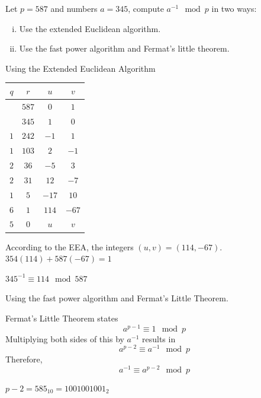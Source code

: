 \documentclass[12pt]{article}
\begin{document}

\problem Let $p=587$ and numbers $a=345$, compute $a^{-1}\mod{p}$ in two
ways:

\begin{enumerate}[(i)]
    \item Use the extended Euclidean algorithm.
    \item Use the fast power algorithm and Fermat’s little theorem. 
\end{enumerate}

\solution Using the Extended Euclidean Algorithm

\noindent
\begin{tabular}{|c|c|c|c|}
    \hline
    $q$ & $r$   & $u$  & $v$  \\
    \hline
        & $587$ & $0$   & $1$   \\
        & $345$ & $1$   & $0$   \\
    $1$ & $242$ & $-1$  & $1$   \\
    $1$ & $103$ & $2$   & $-1$  \\
    $2$ & $36$  & $-5$  & $3$   \\
    $2$ & $31$  & $12$  & $-7$  \\
    $1$ & $5$   & $-17$ & $10$  \\
    $6$ & $1$   & $114$ & $-67$ \\
    $5$ & $0$   & $u$   & $v$   \\
    \hline
\end{tabular}

\noindent
According to the EEA, the integers $(u,v)=(114,-67)$.\\
$354(114)+587(-67)=1$

$345^{-1}\equiv114\mod{587}$

\newpage
\noindent
Using the fast power algorithm and Fermat's Little Theorem.

\noindent
Fermat's Little Theorem states
\[a^{p-1}\equiv 1\mod{p}\]
Multiplying both sides of this by $a^{-1}$ results in
\[a^{p-2}\equiv a^{-1}\mod{p}\]
Therefore, 
\[a^{-1}\equiv a^{p-2}\mod{p}\]

\noindent
$p-2=585_{10}=1001001001_2$
\end{document}
